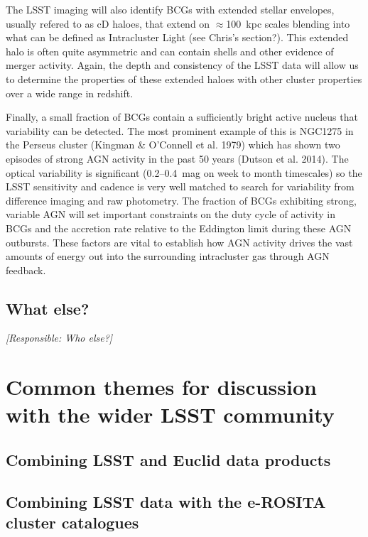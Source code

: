 \documentclass[a4paper,11pt]{article}
\begin{document}
The LSST imaging will also identify BCGs
with extended stellar envelopes,
usually refered to as cD haloes,
that extend on $\approx$100~kpc scales
blending into what can be defined
as Intracluster Light (see Chris's section?).
This extended halo is often quite asymmetric
and can contain shells and other evidence
of merger activity. Again, the depth and
consistency of the LSST data will allow us
to determine the properties of these 
extended haloes with other cluster properties
over a wide range in redshift.

Finally, a small fraction of BCGs contain a
sufficiently bright active nucleus that
variability can be detected. The most prominent
example of this is NGC1275 in the Perseus cluster
(Kingman \& O'Connell et al. 1979) which has shown 
two episodes of strong AGN activity in the past
50 years (Dutson et al. 2014). The optical
variability is significant (0.2--0.4~mag on
week to month timescales) so the LSST sensitivity
and cadence is very well matched to search for 
variability from difference imaging and raw
photometry. The fraction of BCGs exhibiting 
strong, variable AGN will set important
constraints on the duty cycle of activity in 
BCGs and the accretion rate relative to 
the Eddington limit during these AGN outbursts.
These factors are vital to establish how
AGN activity drives the vast amounts of energy
out into the surrounding intracluster gas
through AGN feedback.



\subsection{What else?}

{\it [Responsible: Who else?]}

\section{Common themes for discussion with the wider LSST community}

\subsection{Combining LSST and Euclid data products}

\subsection{Combining LSST data with the e-ROSITA cluster catalogues}
\end{document}
